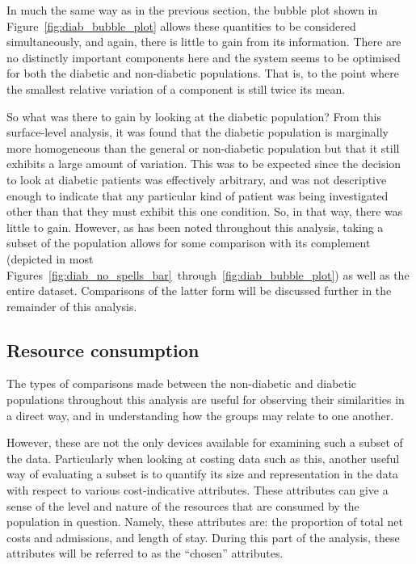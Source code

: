 In much the same way as in the previous section, the bubble plot shown in
Figure~\ref{fig:diab_bubble_plot} allows these quantities to be considered
simultaneously, and again, there is little to gain from its information. There
are no distinctly important components here and the system seems to be optimised
for both the diabetic and non-diabetic populations. That is, to the point where
the smallest relative variation of a component is still twice its mean.

So what was there to gain by looking at the diabetic population? From this
surface-level analysis, it was found that the diabetic population is marginally
more homogeneous than the general or non-diabetic population but that it still
exhibits a large amount of variation. This was to be expected since the decision
to look at diabetic patients was effectively arbitrary, and was not descriptive
enough to indicate that any particular kind of patient was being investigated
other than that they must exhibit this one condition. So, in that way, there was
little to gain. However, as has been noted throughout this analysis, taking a
subset of the population allows for some comparison with its complement
(depicted in most
Figures~\ref{fig:diab_no_spells_bar}~through~\ref{fig:diab_bubble_plot}) as well
as the entire dataset. Comparisons of the latter form will be discussed further
in the remainder of this analysis.


\subsection{Resource consumption}\label{subsec:diab_resources}

The types of comparisons made between the non-diabetic and diabetic populations
throughout this analysis are useful for observing their similarities in a direct
way, and in understanding how the groups may relate to one another.

However, these are not the only devices available for examining such a subset of
the data. Particularly when looking at costing data such as this, another useful
way of evaluating a subset is to quantify its size and representation in the
data with respect to various cost-indicative attributes. These attributes can
give a sense of the level and nature of the resources that are consumed by the
population in question. Namely, these attributes are: the proportion of total
net costs and admissions, and length of stay. During this part of the analysis,
these attributes will be referred to as the ``chosen'' attributes.


